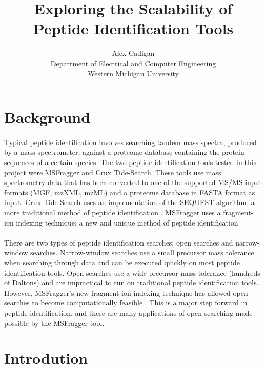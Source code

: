 \documentclass [11pt] {article}
\title {Exploring the Scalability of Peptide Identification Tools}
\author {Alex Cadigan \\ Department of Electrical and Computer Engineering \\ Western Michigan University}
\begin{document}
	\maketitle

	
	\section {Background}
	
	\paragraph {}
	\qquad Typical peptide identification involves searching tandem mass spectra, produced by a mass spectrometer, against a proteome database containing the protein sequences of a certain species.  The two peptide identification tools tested in this project were MSFragger and Crux Tide-Search.  These tools use mass spectrometry data that has been converted to one of the supported MS/MS input formats (MGF, mzXML, mzML) and a proteome database in FASTA format as input.  Crux Tide-Search uses an implementation of the SEQUEST algorithm; a more traditional method of peptide identification \cite {mcilwain2014crux}.  MSFragger uses a fragment-ion indexing technique; a new and unique method of peptide identification \cite {kong2017msfragger}
	\paragraph {}
	\qquad There are two types of peptide identification searches: open searches and narrow-window searches.  Narrow-window searches use a small precursor mass tolerance when searching through data and can be executed quickly on most peptide identification tools.  Open searches use a wide precursor mass tolerance (hundreds of Daltons) and are impractical to run on traditional peptide identification tools.  However, MSFragger's new fragment-ion indexing technique has allowed open searches to become computationally feasible \cite {kong2017msfragger}.  This is a major step forward in peptide identification, and there are many applications of open searching made possible by the MSFragger tool.
	
	
	\section {Introdution}
	
\end{document}
